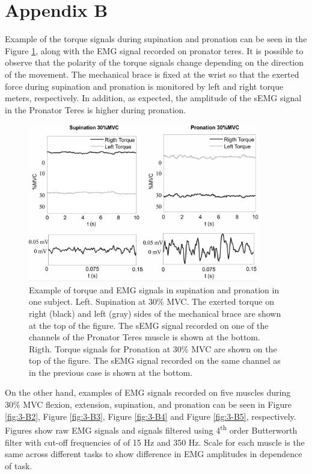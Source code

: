 \section{Appendix B}\label{Apx B}
Example of the torque signals during supination and pronation can be seen in the Figure \ref{fig:3-B1}, along with the EMG signal recorded on pronator teres. It is possible to observe that the polarity of the torque signals change depending on the direction of the movement. The mechanical brace is fixed at the wrist so that the exerted force during supination and pronation is monitored by left and right torque meters, respectively. In addition, as expected, the amplitude of the sEMG signal in the Pronator Teres is higher during pronation.

\begin{figure}[ht]
\centering
\includegraphics[width=0.9\textwidth]{Images/figure3_B1.png}
\caption{Example of torque and EMG signals in supination and pronation in one subject. Left. Supination at 30\% MVC. The exerted torque on right (black) and left (gray) sides of the mechanical brace are shown at the top of the figure. The sEMG signal recorded on one of the channels of the Pronator Teres muscle is shown at the bottom. Rigth. Torque signals for Pronation at 30\% MVC are shown on the top of the figure. The sEMG signal recorded on the same channel as in the previous case is shown at the bottom.}
\label{fig:3-B1}
\end{figure}   


On the other hand, examples of EMG signals recorded on five muscles during 30\% MVC flexion, extension, supination, and pronation can be seen in Figure \ref{fig:3-B2}, Figure \ref{fig:3-B3}, Figure \ref{fig:3-B4} and Figure \ref{fig:3-B5}, respectively. Figures show raw EMG signals and signals filtered using 4\textsuperscript{th} order Butterworth filter with cut-off frequencies of of 15 Hz and 350 Hz. Scale for each muscle is the same across different tasks to show difference in EMG amplitudes in dependence of task.

